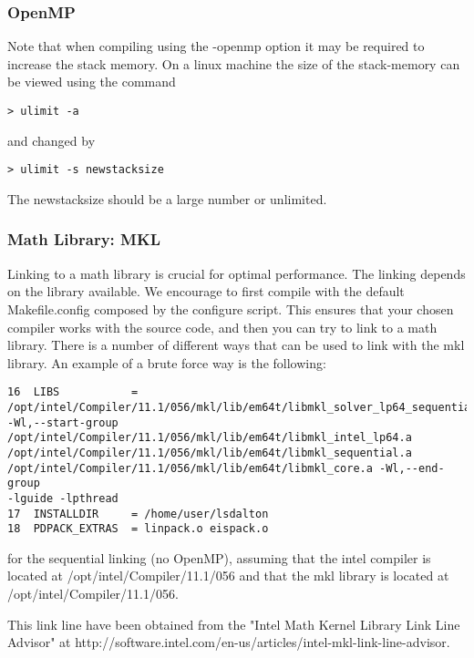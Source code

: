 \subsubsection{OpenMP}
Note that when compiling using the -openmp option it may be required to increase the stack memory. On a linux machine the size of the stack-memory can be viewed using the command
\begin{verbatim}
> ulimit -a
\end{verbatim}
and changed by
\begin{verbatim}
> ulimit -s newstacksize
\end{verbatim}
The newstacksize should be a large number or unlimited.

\subsubsection{Math Library: MKL}\label{mkl:ifort1}
Linking to a math library is crucial for optimal performance. The linking 
depends on the library available. We encourage to first compile with the 
default Makefile.config composed by the configure script. This ensures that 
your chosen compiler works with the {\lsdalton} source code,
and then you can try to link to a math library.
There is a number of different ways that can be used to 
link {\lsdalton} with the mkl library.
An example of a brute force way is the following:
\begin{verbatim}
16  LIBS           = 
/opt/intel/Compiler/11.1/056/mkl/lib/em64t/libmkl_solver_lp64_sequential.a 
-Wl,--start-group /opt/intel/Compiler/11.1/056/mkl/lib/em64t/libmkl_intel_lp64.a 
/opt/intel/Compiler/11.1/056/mkl/lib/em64t/libmkl_sequential.a 
/opt/intel/Compiler/11.1/056/mkl/lib/em64t/libmkl_core.a -Wl,--end-group 
-lguide -lpthread
17  INSTALLDIR     = /home/user/lsdalton
18  PDPACK_EXTRAS  = linpack.o eispack.o
\end{verbatim}
for the sequential linking (no OpenMP), assuming that the intel compiler is 
located at /opt/intel/Compiler/11.1/056 and that the mkl library is located 
at /opt/intel/Compiler/11.1/056.

This link line have been obtained from the "Intel Math Kernel Library Link Line Advisor" 
at http://software.intel.com/en-us/articles/intel-mkl-link-line-advisor.

